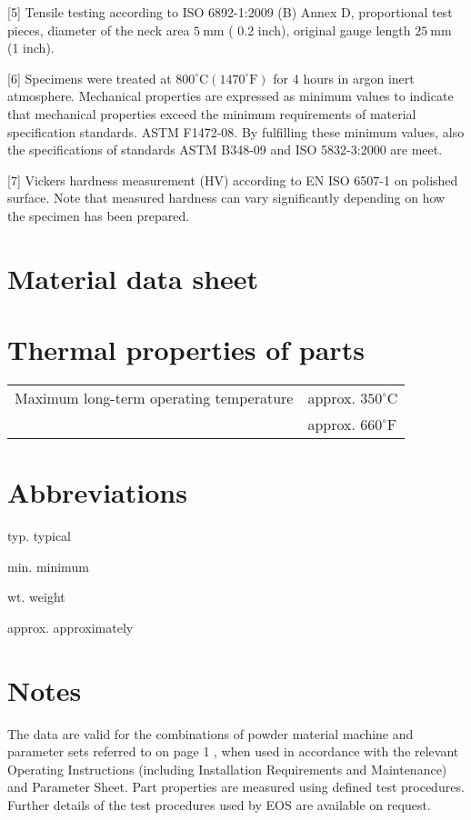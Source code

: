 \documentclass[10pt]{article}
\begin{document}
[5] Tensile testing according to ISO 6892-1:2009 (B) Annex D, proportional test pieces, diameter of the neck area $5 \mathrm{~mm}$ ( 0.2 inch), original gauge length $25 \mathrm{~mm}$ (1 inch).

[6] Specimens were treated at $800^{\circ} \mathrm{C}\left(1470^{\circ} \mathrm{F}\right)$ for 4 hours in argon inert atmosphere. Mechanical properties are expressed as minimum values to indicate that mechanical properties exceed the minimum requirements of material specification standards. ASTM F1472-08. By fulfilling these minimum values, also the specifications of standards ASTM B348-09 and ISO 5832-3:2000 are meet.

[7] Vickers hardness measurement (HV) according to EN ISO 6507-1 on polished surface. Note that measured hardness can vary significantly depending on how the specimen has been prepared.

\section*{Material data sheet}
\section*{Thermal properties of parts}
\begin{center}
\begin{tabular}{ll}
\hline
Maximum long-term operating temperature & approx. $350^{\circ} \mathrm{C}$ \\
 & approx. $660^{\circ} \mathrm{F}$ \\
\end{tabular}
\end{center}

\section*{Abbreviations}
typ. typical

min. minimum

wt. weight

approx. approximately

\section*{Notes}
The data are valid for the combinations of powder material machine and parameter sets referred to on page 1 , when used in accordance with the relevant Operating Instructions (including Installation Requirements and Maintenance) and Parameter Sheet. Part properties are measured using defined test procedures. Further details of the test procedures used by EOS are available on request.
\end{document}
